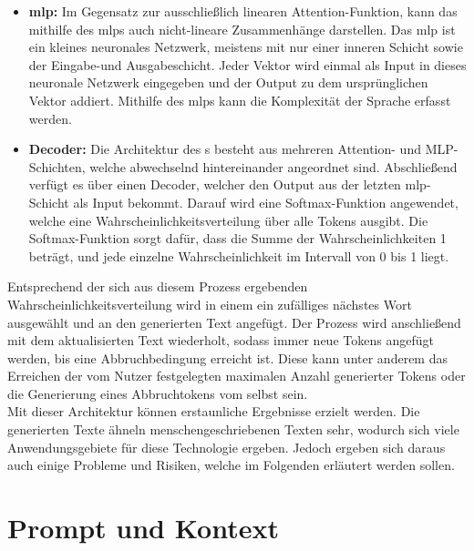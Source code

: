 \documentclass[../main.tex]{subfiles}
\begin{document}
\begin{itemize}
\item \textbf{\acrfull{mlp}:} Im Gegensatz zur ausschließlich linearen Attention-Funktion, kann das  mithilfe des \acrshort{mlp}s auch nicht-lineare Zusammenhänge darstellen. Das \acrshort{mlp} ist ein kleines neuronales Netzwerk, meistens mit nur einer inneren Schicht sowie der Eingabe-und Ausgabeschicht. Jeder Vektor wird einmal als Input in dieses neuronale Netzwerk eingegeben und der Output zu dem ursprünglichen Vektor addiert. Mithilfe des \acrshort{mlp}s kann die Komplexität der Sprache erfasst werden.

\item \textbf{Decoder:} Die Architektur des s besteht aus mehreren Attention- und MLP-Schichten, welche abwechselnd hintereinander angeordnet sind. Abschließend verfügt es über einen Decoder, welcher den Output aus der letzten \acrshort{mlp}-Schicht als Input bekommt. Darauf wird eine Softmax-Funktion angewendet, welche eine Wahrscheinlichkeitsverteilung über alle Tokens ausgibt. Die Softmax-Funktion sorgt dafür, dass die Summe der Wahrscheinlichkeiten 1 beträgt, und jede einzelne Wahrscheinlichkeit im Intervall von 0 bis 1 liegt.\cite{architecture} 
\end{itemize}


Entsprechend der sich aus diesem Prozess ergebenden Wahrscheinlichkeitsverteilung wird in einem  ein zufälliges nächstes Wort ausgewählt und an den generierten Text angefügt. 
Der Prozess wird anschließend mit dem aktualisierten Text wiederholt, sodass immer neue Tokens angefügt werden, bis eine Abbruchbedingung erreicht ist. Diese kann unter anderem das 
Erreichen der vom Nutzer festgelegten maximalen Anzahl generierter Tokens oder die Generierung eines Abbruchtokens vom  selbst sein.\cite{architecture}\\

Mit dieser Architektur können erstaunliche Ergebnisse erzielt werden. Die generierten Texte ähneln menschengeschriebenen Texten sehr, wodurch sich viele Anwendungsgebiete für diese Technologie ergeben. Jedoch ergeben sich daraus auch einige Probleme und Risiken, welche im Folgenden erläutert werden sollen. 

\section{Prompt und Kontext}
\end{document}
